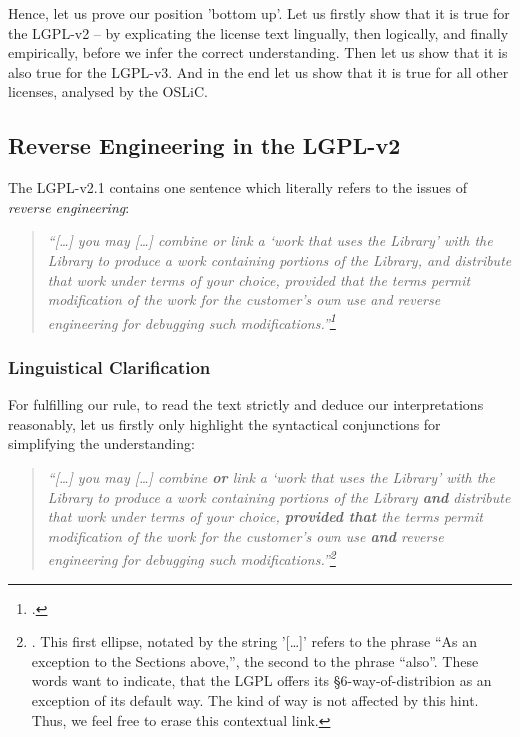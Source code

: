 Hence, let us prove our position 'bottom up'. Let us firstly show that it is
true for the LGPL-v2 -- by explicating the license text lingually, then
logically, and finally empirically, before we infer the correct understanding.
Then let us show that it is also true for the LGPL-v3. And in the end let us
show that it is true for all other licenses, analysed by the OSLiC.

\subsection{Reverse Engineering in the LGPL-v2}
The LGPL-v2.1 contains one sentence which literally refers to the issues of 
\emph{reverse engineering}:

\begin{quote}\noindent\emph{\enquote{[\ldots] you may [\ldots] combine or link a
\enquote{work that uses the Library} with the Library to produce a work
containing portions of the Library, and distribute that work under terms of your
choice, provided that the terms permit modification of the work for the
customer's own use and \emph{reverse engineering} for debugging such
modifications.}\footcite[cf.][\nopage wp]{Lgpl21OsiLicense1999a}}
\end{quote}

\subsubsection{Linguistical Clarification}

For fulfilling our rule, to read the text strictly and deduce our
interpretations reasonably, let us firstly only highlight the syntactical
conjunctions for simplifying the understanding:

\begin{quote}\noindent\emph{\enquote{[\ldots] you may [\ldots] combine
\textbf{or} link a \enquote{work that uses the Library} with the Library to
produce a work containing portions of the Library \textbf{and} distribute that
work under terms of your choice, \textbf{provided that} the terms permit
modification of the work for the customer's own use \textbf{and} \emph{reverse
engineering} for debugging such modifications.}\footnote{\cite[cf.][\nopage wp.
emphasis KR.]{Lgpl21OsiLicense1999a}. This first ellipse, notated by the string
'[\ldots]' refers to the phrase \enquote{As an exception to the Sections
above,}, the second to the phrase \enquote{also}. These words want to indicate,
that the LGPL offers its §6-way-of-distribion as an exception of its default
way. The kind of way is not affected by this hint. Thus, we feel free to
erase this contextual link. } }
\end{quote}

